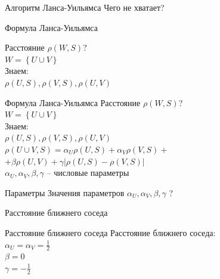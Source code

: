 \documentclass[10pt]{beamer}
\begin{document}
\begin{frame}{Алгоритм Ланса-Уильямса}
  Чего не хватает?
\end{frame}

\begin{frame}{Формула Ланса-Уильямса}
	\begin{minipage}[t]{0.55\linewidth}
		Расстояние $\rho(W, S)$?\\
		${ W = \left\{ U \cup V \right\} }$\\	
		Знаем:\\
		${\rho(U, S), \rho(V, S), \rho(U, V)}$
	\end{minipage}%

\end{frame}

\begin{frame}{Формула Ланса-Уильямса}
	Расстояние $\rho(W, S)$?\\
	${ W = \left\{ U \cup V \right\} }$\\
	\bigbreak
	Знаем:\\
	${\rho(U, S), \rho(V, S), \rho(U, V)}$\\
  \bigbreak
	${\rho(U \cup V, S) = \alpha_U \rho(U, S) + \alpha_V \rho(V, S) + }$ \\
	\hspace{30mm} ${ + \beta \rho(U, V) + \gamma \vert \rho(U, S) - \rho(V, S)\vert}$\\
	\bigbreak
	${\alpha_U, \alpha_V, \beta, \gamma}$ -- числовые параметры
\end{frame}

\begin{frame}{Параметры}
	Значения параметров
	${\alpha_U, \alpha_V, \beta, \gamma}$ ?
\end{frame}

\begin{frame}{Расстояние ближнего соседа}
\end{frame}

\begin{frame}{Расстояние ближнего соседа}
	Расстояние ближнего соседа:\\
	${\alpha_U = \alpha_V = \frac{1}{2}}$ \\${\beta = 0}$ \\${\gamma = -\frac{1}{2}}$
\end{frame}
\end{document}
